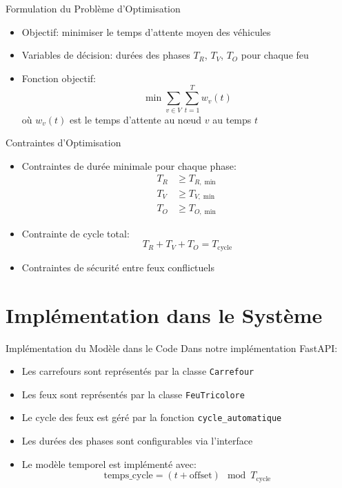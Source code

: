 \documentclass{beamer}
\begin{document}
\begin{frame}{Formulation du Problème d'Optimisation}
\begin{itemize}
    \item Objectif: minimiser le temps d'attente moyen des véhicules
    \item Variables de décision: durées des phases $T_R$, $T_V$, $T_O$ pour chaque feu
    \item Fonction objectif:
    \begin{equation}
    \min \sum_{v \in V} \sum_{t=1}^{T} w_v(t)
    \end{equation}
    où $w_v(t)$ est le temps d'attente au nœud $v$ au temps $t$
\end{itemize}
\end{frame}

\begin{frame}{Contraintes d'Optimisation}
\begin{itemize}
    \item Contraintes de durée minimale pour chaque phase:
    \begin{align}
    T_R &\geq T_{R,\min} \\
    T_V &\geq T_{V,\min} \\
    T_O &\geq T_{O,\min}
    \end{align}
    
    \item Contrainte de cycle total:
    \begin{equation}
    T_R + T_V + T_O = T_{\text{cycle}}
    \end{equation}
    
    \item Contraintes de sécurité entre feux conflictuels
\end{itemize}
\end{frame}

\section{Implémentation dans le Système}

\begin{frame}{Implémentation du Modèle dans le Code}
Dans notre implémentation FastAPI:
\begin{itemize}
    \item Les carrefours sont représentés par la classe \texttt{Carrefour}
    \item Les feux sont représentés par la classe \texttt{FeuTricolore}
    \item Le cycle des feux est géré par la fonction \texttt{cycle\_automatique}
    \item Les durées des phases sont configurables via l'interface
    \item Le modèle temporel est implémenté avec:
    \begin{equation}
    \text{temps\_cycle} = (t + \text{offset}) \mod T_{\text{cycle}}
    \end{equation}
\end{itemize}
\end{frame}
\end{document}
